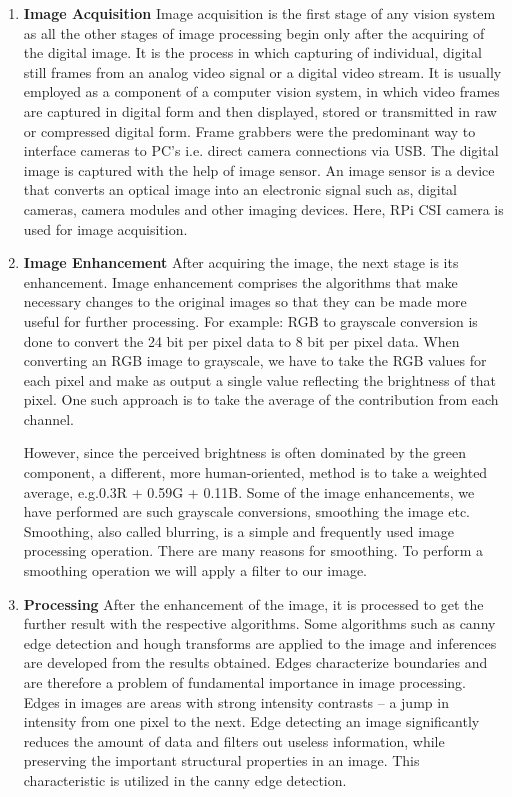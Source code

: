 \documentclass[12pt, a4paper]{article}
\begin{document}
\begin{enumerate}
\item \textbf{Image Acquisition}
Image acquisition is the first stage of any vision system as all the other stages of image processing begin only after the acquiring of the digital image. It is the process in which capturing of
individual, digital still frames from an analog video signal or a digital video stream.
It is usually employed as a component of a computer vision system, in which video
frames are captured in digital form and then displayed, stored or transmitted in raw
or compressed digital form. Frame grabbers were the predominant way to interface
cameras to PC's i.e. direct camera connections via USB. The digital image is captured with the help of image sensor. An image sensor is a device that converts an optical image into an electronic signal such as, digital cameras, camera modules and other imaging devices. Here, RPi CSI camera is used for image acquisition.

\item \textbf{Image Enhancement}
After acquiring the image, the next stage is its enhancement. Image enhancement comprises the algorithms that make necessary changes to the original images so that they can be made more useful for further processing. For example: RGB to grayscale conversion is done to convert the 24 bit per pixel data to 8 bit per pixel data. 
When converting an RGB image to
grayscale, we have to take the RGB values for each pixel and make as output a
single value reflecting the brightness of that pixel. One such approach is to take the
average of the contribution from each channel. 

However, since the
perceived brightness is often dominated by the green component, a different, more human-oriented, method is to take a weighted average, e.g.0.3R + 0.59G + 0.11B. Some of the image enhancements, we have performed are such grayscale conversions, smoothing the image etc. 
Smoothing, also called blurring, is a simple and
frequently used image processing operation. There are many reasons for
smoothing. To perform a smoothing
operation we will apply a filter to our image.

\item \textbf{Processing}
After the enhancement of the image, it is processed to get the further result with the respective algorithms. Some algorithms such as canny edge detection and hough transforms are applied to the image and inferences are developed from the results obtained. Edges characterize boundaries and are
therefore a problem of fundamental importance in image processing. Edges in
images are areas with strong intensity contrasts – a jump in intensity from one pixel to the next. Edge detecting an image significantly reduces the amount of data and
filters out useless information, while preserving the important structural properties
in an image. This characteristic is utilized in the canny edge detection.


\end{enumerate}
\end{document}
